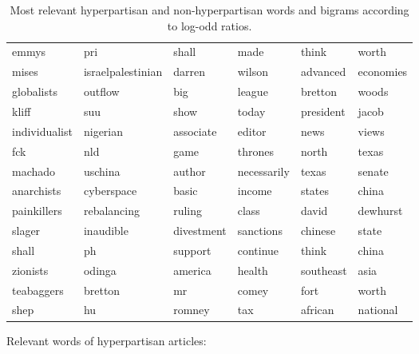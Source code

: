 \documentclass[11pt,a4paper]{article}
\begin{document}
\begin{table*}[ht]
\begin{tabular}{l|l|ll|ll}
emmys             & pri               & shall       & made        & think         & worth        \\
mises             & israelpalestinian & darren      & wilson      & advanced      & economies    \\
globalists        & outflow           & big         & league      & bretton       & woods        \\
kliff             & suu               & show        & today       & president     & jacob        \\
individualist     & nigerian          & associate   & editor      & news          & views        \\
fck               & nld               & game        & thrones     & north         & texas        \\
machado           & uschina           & author      & necessarily & texas         & senate       \\
anarchists        & cyberspace        & basic       & income      & states        & china        \\
painkillers       & rebalancing       & ruling      & class       & david         & dewhurst     \\
slager            & inaudible         & divestment  & sanctions   & chinese       & state        \\
shall             & ph                & support     & continue    & think         & china        \\
zionists          & odinga            & america     & health      & southeast     & asia         \\
teabaggers        & bretton           & mr          & comey       & fort          & worth        \\
shep              & hu                & romney      & tax         & african       & national     \\ \bottomrule
\end{tabular}
\caption{Most relevant hyperpartisan and non-hyperpartisan words and bigrams according to log-odd ratios.}
\label{tab:words_bigrams}
\end{table*}

Relevant words of hyperpartisan articles:
\end{document}
